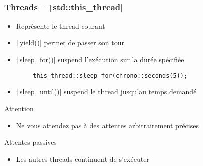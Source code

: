 \documentclass[C++.tex]{subfiles}
\begin{document}
\begin{frame}[fragile]
	\frametitle{Threads -- \texttt|std::this_thread|}
	\begin{itemize}
		\item Représente le thread courant
		\item \texttt|yield()| permet de \og passer son tour\fg{}


		\item \texttt|sleep_for()| suspend l'exécution sur la durée spécifiée
	\end{itemize}

	\begin{verbatim}
		this_thread::sleep_for(chrono::seconds(5));
	\end{verbatim}

	\begin{itemize}
		\item \texttt|sleep_until()| suspend le thread jusqu'au temps demandé
	\end{itemize}

	\begin{alertblock}{Attention}
		\begin{itemize}
			\item Ne vous attendez pas à des attentes arbitrairement précises
		\end{itemize}

	\end{alertblock}

	\begin{block}{Attentes passives}
		\begin{itemize}
			\item Les autres threads continuent de s'exécuter
		\end{itemize}
	\end{block}
\end{frame}
\end{document}
